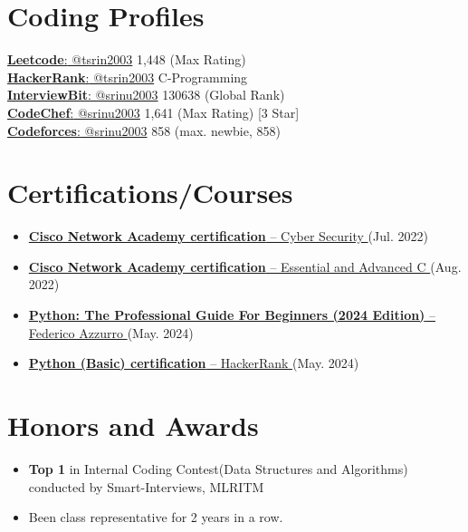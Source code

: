 \documentclass[a4paper,11pt]{article}
\newcommand{\resumeItem}[1]{
  \item\small{
    {#1 \vspace{-2pt}}
  }
}
\newcommand{\resumeItemListStart}{\begin{itemize}}
\newcommand{\resumeItemListEnd}{\end{itemize}\vspace{-5pt}}
\begin{document}
\section{Coding Profiles}
\begin{multicols}{2}
  \begin{itemize}[leftmargin=0.15in, label={}]
    \small{\item{
      \href{https://leetcode.com/tsrin2003/}{\underline{\textbf{Leetcode}}{:} @tsrin2003} 1,448 (Max Rating) \\
      \href{https://www.hackerrank.com/tsrin2003}{\underline{\textbf{HackerRank}}{:} @tsrin2003} C-Programming \\
      \href{https://www.interviewbit.com/profile/srinu2003/}{\underline{\textbf{InterviewBit}}{:} @srinu2003} 130638 (Global Rank) \\
      \href{https://www.codechef.com/users/srinu2003}{\underline{\textbf{CodeChef}}{:} @srinu2003} 1,641 (Max Rating) [3 Star] \\
      \href{https://codeforces.com/profile/srinu2003}{\underline{\textbf{Codeforces}}{:} @srinu2003} 858 (max. newbie, 858) \\
      }
    }
  \end{itemize}
\end{multicols}

\vspace{-3pt}
  \section{Certifications/Courses}
    \resumeItemListStart[parsep = 0pt]
      \resumeItem{\href{https://drive.google.com/file/d/1pywMAJxX-Mg6qSX5HHIW5wEbV3PR07LQ/view?usp=drive_link}
                        {\textbf{Cisco Network Academy certification} -- Cyber Security \faExternalLink*} (Jul. 2022)}
      \resumeItem{\href{https://drive.google.com/file/d/1w72XSRwblf5AqqEBGvnUbvUayJTcpWO-/view?usp=drive_link}
                        {\textbf{Cisco Network Academy certification} -- Essential and Advanced C \faExternalLink*} (Aug. 2022)}
      \resumeItem{\href{https://www.udemy.com/certificate/UC-79138624-8361-423b-b131-42765a08db12/}
                        {\textbf{Python: The Professional Guide For Beginners (2024 Edition)} -- \href{https://www.linkedin.com/in/federicoazzu/}{Federico Azzurro} \faExternalLink*} (May. 2024)}
      \resumeItem{\href{https://www.hackerrank.com/certificates/607a2d4d88f1}
                        {\textbf{Python (Basic) certification} -- HackerRank \faExternalLink*} (May. 2024)}
      
    \resumeItemListEnd

  
\vspace{-11pt}
\section{Honors and Awards}
  \resumeItemListStart[parsep = -2pt]
    \resumeItem{\textbf{Top 1} in Internal Coding Contest(Data Structures and Algorithms) conducted by Smart-Interviews, MLRITM}
    \resumeItem{Been class representative for 2 years in a row.}
  \resumeItemListEnd

\end{document}
